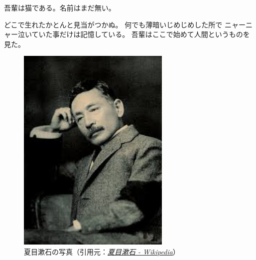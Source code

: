 \documentclass[uplatex]{jsarticle}
\newcommand{\linedhref}[2]{\underline{\href{#1}{\emph{#2}}}}
\begin{document}
吾輩は猫である。名前はまだ無い\cite{Soseki1905}。

どこで生れたかとんと見当がつかぬ。
何でも薄暗いじめじめした所で
ニャーニャー泣いていた事だけは記憶している。
吾輩はここで始めて人間というものを見た。

\begin{figure}[H]
    \begin{center}
      \includegraphics[height=10cm]{img/natsume_soseki.jpeg}      
      \caption{夏目漱石の写真（引用元：\linedhref{https://ja.wikipedia.org/wiki/\%E5\%A4\%8F\%E7\%9B\%AE\%E6\%BC\%B1\%E7\%9F\%B3}{夏目漱石 - Wikipedia}）}
    \end{center}
\end{figure}



\end{document}
